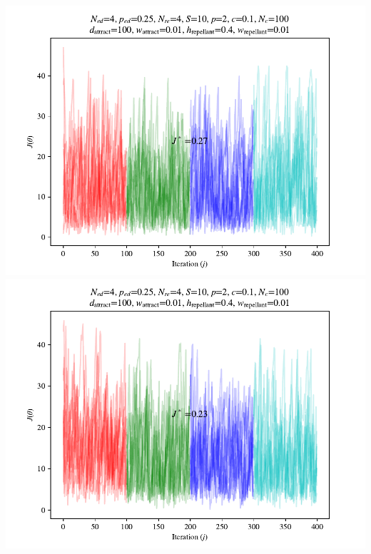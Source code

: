\documentclass{beamer}
\begin{document}
\begin{frame}
\begin{columns}[T]
\begin{center}
    \includegraphics[scale=0.3]{assets/rastrigin_colony_ed_2_J}
    \includegraphics[scale=0.3]{assets/rastrigin_colony_ed_3_J}
  \end{center}
\end{columns}
\end{frame}
\end{document}
